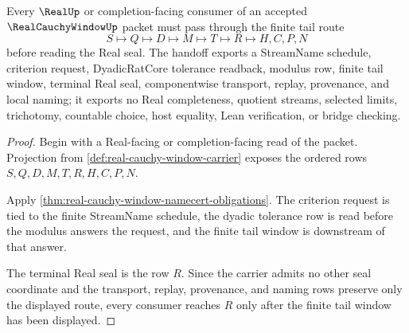 \begin{theorem}
\label{thm:real-cauchy-window-finite-tail-handoff}
Every $\RealUp$ or completion-facing consumer of an accepted $\RealCauchyWindowUp$ packet must pass through the finite tail route
$$
S \longmapsto Q \longmapsto D \longmapsto M \longmapsto T \longmapsto R \longmapsto H,C,P,N
$$
before reading the Real seal. The handoff exports a StreamName schedule, criterion request, DyadicRatCore tolerance readback, modulus row, finite tail window, terminal Real seal, componentwise transport, replay, provenance, and local naming; it exports no Real completeness, quotient streams, selected limits, trichotomy, countable choice, host equality, Lean verification, or bridge checking.
\end{theorem}
\begin{proof}
Begin with a Real-facing or completion-facing read of the packet. Projection from \autoref{def:real-cauchy-window-carrier} exposes the ordered rows $S,Q,D,M,T,R,H,C,P,N$.

Apply \autoref{thm:real-cauchy-window-namecert-obligations}. The criterion request is tied to the finite StreamName schedule, the dyadic tolerance row is read before the modulus answers the request, and the finite tail window is downstream of that answer.

The terminal Real seal is the row $R$. Since the carrier admits no other seal coordinate and the transport, replay, provenance, and naming rows preserve only the displayed route, every consumer reaches $R$ only after the finite tail window has been displayed.
\end{proof}


\begin{closurestatus}{\RealCauchyWindowUp}
  \theoryclosure{\seedClosure}
  \formalstatus{\unformalizedV}
\end{closurestatus}

